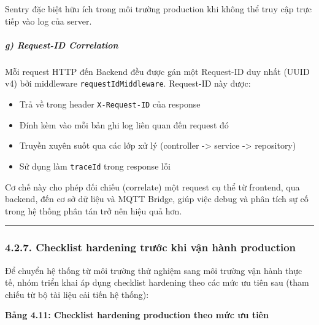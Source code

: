 \documentclass[13pt,a4paper]{extarticle}
\renewcommand{\\}{\thesislongtableorignewline\hline}%
\newcommand{\thesistabletitle}[1]{%
  \begin{center}\textbf{#1}\end{center}%
}
\providecommand{\tightlist}{%
  \setlength{\itemsep}{0pt}\setlength{\parskip}{0pt}}
\begin{document}
Sentry đặc biệt hữu ích trong môi trường production khi không thể truy
cập trực tiếp vào log của server.

\subparagraph{g) Request-ID Correlation}\label{g-request-id-correlation}

Mỗi request HTTP đến Backend đều được gán một Request-ID duy nhất (UUID
v4) bởi middleware \texttt{requestIdMiddleware}. Request-ID này được:

\begin{itemize}
\tightlist
\item
  Trả về trong header \texttt{X-Request-ID} của response
\item
  Đính kèm vào mỗi bản ghi log liên quan đến request đó
\item
  Truyền xuyên suốt qua các lớp xử lý (controller -\textgreater{}
  service -\textgreater{} repository)
\item
  Sử dụng làm \texttt{traceId} trong response lỗi
\end{itemize}

Cơ chế này cho phép đối chiếu (correlate) một request cụ thể từ
frontend, qua backend, đến cơ sở dữ liệu và MQTT Bridge, giúp việc debug
và phân tích sự cố trong hệ thống phân tán trở nên hiệu quả hơn.

\begin{center}\rule{0.5\linewidth}{0.5pt}\end{center}

\subsubsection{4.2.7. Checklist hardening trước khi vận hành
production}\label{427-checklist-hardening-trux1b0ux1edbc-khi-vux1eadn-huxe0nh-production}

Để chuyển hệ thống từ môi trường thử nghiệm sang môi trường vận hành
thực tế, nhóm triển khai áp dụng checklist hardening theo các mức ưu
tiên sau (tham chiếu từ bộ tài liệu cải tiến hệ thống):

\thesistabletitle{Bảng 4.11: Checklist hardening production theo mức ưu tiên}
\end{document}
